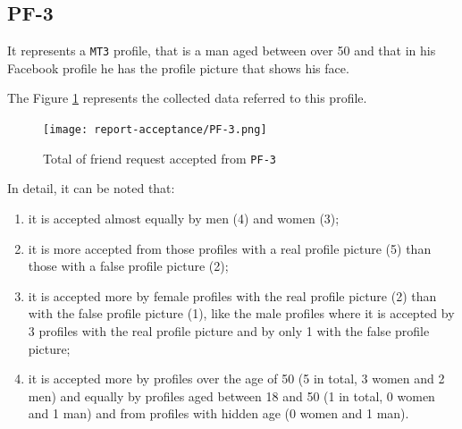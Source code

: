 \subsection*{PF-3}
It represents a \texttt{MT3} profile, that is a man aged between over 50 and that in his Facebook profile he has the profile picture that shows his face.
\par \noindent The Figure \ref{fig:accepted-from-PF3} represents the collected data referred to this profile.
\begin{figure}[H]	
	\centering
	\texttt{[image: report-acceptance/PF-3.png]} 
	\caption{Total of friend request accepted from \texttt{PF-3}}
	\label{fig:accepted-from-PF3}
\end{figure}
\par \noindent In detail, it can be noted that:
\begin{enumerate}
	\item it is accepted almost equally by men (4) and women (3);
	\item it is more accepted from those profiles with a real profile picture (5) than those with a false profile picture (2);
	\item it is accepted more by female profiles with the real profile picture (2) than with the false profile picture (1), like the male profiles where it is accepted by 3 profiles with the real profile picture and by only 1 with the false profile picture;
	\item it is accepted more by profiles over the age of 50 (5 in total, 3 women and 2 men) and equally by profiles aged between 18 and 50 (1 in total, 0 women and 1 man) and from profiles with hidden age (0 women and 1 man).
\end{enumerate}


